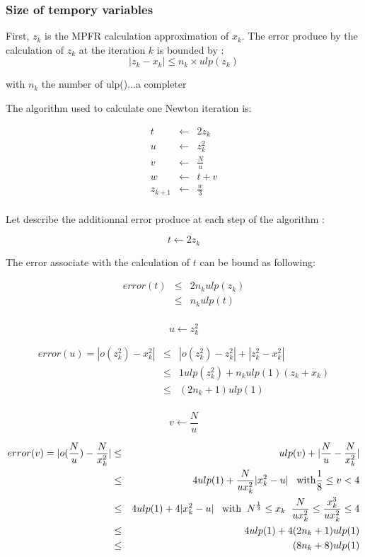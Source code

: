 \documentclass[12pt]{amsart}
\begin{document}
\subsubsection{Size of tempory variables}


First, $z_k$ is the MPFR calculation approximation of $x_k$. The error
produce by the calculation of $z_k$ at the iteration $k$ is bounded by
:
\[
|z_k-x_k| \leq n_k \times ulp(z_k)
\]

with $n_k$ the number of ulp()...a completer

The algorithm used to calculate one Newton iteration is:

\begin{eqnarray}\nonumber
t&\leftarrow&2z_k\\\nonumber
u&\leftarrow&z_k^2\\\nonumber
v&\leftarrow&\frac{N}{u}\\\nonumber
w&\leftarrow&t+v\\\nonumber
z_{k+1}&\leftarrow&\frac{w}{3}\\\nonumber
\end{eqnarray}

Let describe the additionnal error produce at each step of the
algorithm :

\[
t \leftarrow 2 z_k
\]

The error associate with the calculation of $t$ can be bound as
following:

\begin{eqnarray}\nonumber
  error(t) &\leq& 2 n_k ulp(z_k)\\\nonumber
         &\leq& n_k ulp(t)\\\nonumber
\end{eqnarray}


\[
u\leftarrow z_k^2
\]



\begin{eqnarray}\nonumber
  error(u) = |o(z_k^2)-x_k^2| &\leq& |o(z_k^2)-z_k^2| +
  |z_k^2-x_k^2|\\\nonumber
         &\leq& 1 ulp(z_k^2) + n_k ulp(1) (z_k+x_k)\\\nonumber
         &\leq& (2 n_k + 1) ulp(1)\\\nonumber
\end{eqnarray}

\[
v \leftarrow \frac{N}{u}
\]

\begin{eqnarray}\nonumber
  error(v) = |o(\frac{N}{u})-\frac{N}{x_k^2}| &\leq& ulp(v) +
  |\frac{N}{u}-\frac{N}{x_k^2}|\\\nonumber
         &\leq& 4 ulp(1) + \frac{N}{u
           x_k^2}|x_k^2-u|\;\;\;{\textnormal{with}} \frac{1}{8}\leq v <4\\\nonumber
         &\leq& 4 ulp(1) + 4 |x_k^2-u|\;\;\;{\textnormal{with}} \;\;N^{\frac{1}{3}} \leq x_k\;\;\frac{N}{u
           x_k^2} \leq \frac{x_k^3}{u x_k^2}\leq 4
         \\\nonumber
         &\leq& 4 ulp(1) + 4(2 n_k + 1) ulp(1)\\\nonumber
         &\leq& (8 n_k + 8) ulp(1)\\\nonumber
\end{eqnarray}
\end{document}
